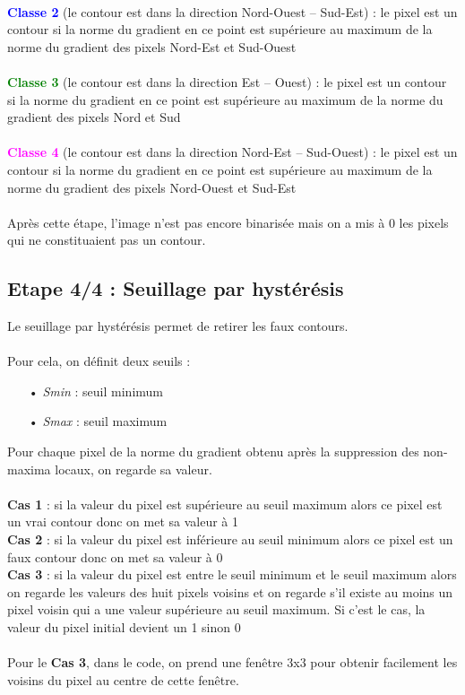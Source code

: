 \\
\textcolor{blue}{\textbf{Classe 2}} (le contour est dans la direction Nord-Ouest \--- Sud-Est) : le pixel est un contour si la norme du gradient en ce point est supérieure au maximum de la norme du gradient des pixels Nord-Est et Sud-Ouest \\
\\
\textcolor{green}{\textbf{Classe 3}} (le contour est dans la direction Est \--- Ouest) : le pixel est un contour si la norme du gradient en ce point est supérieure au maximum de la norme du gradient des pixels Nord et Sud \\
\\
\textcolor{magenta}{\textbf{Classe 4}} (le contour est dans la direction Nord-Est \--- Sud-Ouest) : le pixel est un contour si la norme du gradient en ce point est supérieure au maximum de la norme du gradient des pixels Nord-Ouest et Sud-Est \\
\\
Après cette étape, l'image n'est pas encore binarisée mais on a mis à 0 les pixels qui ne constituaient pas un contour.

\subsection{Etape 4/4 : Seuillage par hystérésis}

Le seuillage par hystérésis permet de retirer les faux contours. \\
\\
Pour cela, on définit deux seuils : 
\begin{itemize}
\item[•] \emph{Smin} : seuil minimum
\item[•] \emph{Smax} : seuil maximum \\
\end{itemize}

Pour chaque pixel de la norme du gradient obtenu après la suppression des non-maxima locaux, on regarde sa valeur. \\
\\
\textbf{Cas 1} : si la valeur du pixel est supérieure au seuil maximum alors ce pixel est un vrai contour donc on met sa valeur à 1 \\
\textbf{Cas 2} : si la valeur du pixel est inférieure au seuil minimum alors ce pixel est un faux contour donc on met sa valeur à 0 \\
\textbf{Cas 3} : si la valeur du pixel est entre le seuil minimum et le seuil maximum alors on regarde les valeurs des huit pixels voisins et on regarde s'il existe au moins un pixel voisin qui a une valeur supérieure au seuil maximum. Si c'est le cas, la valeur du pixel initial devient un 1 sinon 0 \\
\\
Pour le \textbf{Cas 3}, dans le code, on prend une fenêtre $3$x$3$ pour obtenir facilement les voisins du pixel au centre de cette fenêtre. \\

